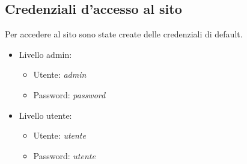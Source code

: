 \subsection{Credenziali d'accesso al sito}
Per accedere al sito sono state create delle credenziali di default.
\begin{itemize}

    \item Livello admin:
    \begin{itemize}

        \item Utente: \textit{admin}
        \item Password: \textit{password}

    \end{itemize}

    \item Livello utente:
    \begin{itemize}

        \item Utente: \textit{utente}
        \item Password: \textit{utente}

    \end{itemize}

\end{itemize}
